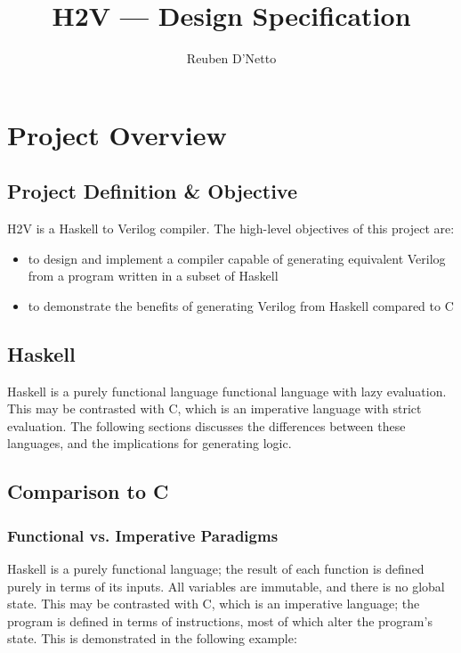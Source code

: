 \documentclass[english,onecolumn]{article}
\begin{document}
\title{H2V --- Design Specification}
\author{Reuben D'Netto}

\maketitle
\tableofcontents{}
\pagebreak{}

\section{Project Overview}
\subsection{Project Definition \& Objective}
H2V is a Haskell to Verilog compiler. The high-level objectives of this project are:
\begin{itemize}
\item to design and implement a compiler capable of generating equivalent Verilog from a program written in a subset of Haskell
\item to demonstrate the benefits of generating Verilog from Haskell compared to C
\end{itemize}

\subsection{Haskell}
Haskell is a purely functional language functional language with lazy evaluation.
This may be contrasted with C, which is an imperative language with strict evaluation.
The following sections discusses the differences between these languages, and the implications for generating logic.

\subsection{Comparison to C}
\subsubsection{Functional vs. Imperative Paradigms}
Haskell is a purely functional language; the result of each function is defined purely in terms of its inputs. All variables are immutable, and there is no global state. This may be contrasted with C, which is an imperative language; the program is defined in terms of instructions, most of which alter the program's state. This is demonstrated in the following example:
\end{document}
